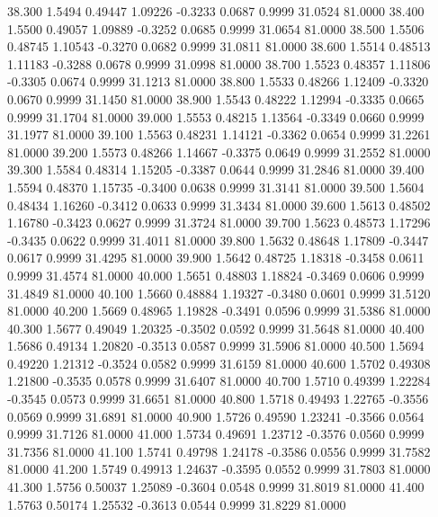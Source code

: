   38.300   1.5494   0.49447   1.09226  -0.3233   0.0687   0.9999  31.0524  81.0000
  38.400   1.5500   0.49057   1.09889  -0.3252   0.0685   0.9999  31.0654  81.0000
  38.500   1.5506   0.48745   1.10543  -0.3270   0.0682   0.9999  31.0811  81.0000
  38.600   1.5514   0.48513   1.11183  -0.3288   0.0678   0.9999  31.0998  81.0000
  38.700   1.5523   0.48357   1.11806  -0.3305   0.0674   0.9999  31.1213  81.0000
  38.800   1.5533   0.48266   1.12409  -0.3320   0.0670   0.9999  31.1450  81.0000
  38.900   1.5543   0.48222   1.12994  -0.3335   0.0665   0.9999  31.1704  81.0000
  39.000   1.5553   0.48215   1.13564  -0.3349   0.0660   0.9999  31.1977  81.0000
  39.100   1.5563   0.48231   1.14121  -0.3362   0.0654   0.9999  31.2261  81.0000
  39.200   1.5573   0.48266   1.14667  -0.3375   0.0649   0.9999  31.2552  81.0000
  39.300   1.5584   0.48314   1.15205  -0.3387   0.0644   0.9999  31.2846  81.0000
  39.400   1.5594   0.48370   1.15735  -0.3400   0.0638   0.9999  31.3141  81.0000
  39.500   1.5604   0.48434   1.16260  -0.3412   0.0633   0.9999  31.3434  81.0000
  39.600   1.5613   0.48502   1.16780  -0.3423   0.0627   0.9999  31.3724  81.0000
  39.700   1.5623   0.48573   1.17296  -0.3435   0.0622   0.9999  31.4011  81.0000
  39.800   1.5632   0.48648   1.17809  -0.3447   0.0617   0.9999  31.4295  81.0000
  39.900   1.5642   0.48725   1.18318  -0.3458   0.0611   0.9999  31.4574  81.0000
  40.000   1.5651   0.48803   1.18824  -0.3469   0.0606   0.9999  31.4849  81.0000
  40.100   1.5660   0.48884   1.19327  -0.3480   0.0601   0.9999  31.5120  81.0000
  40.200   1.5669   0.48965   1.19828  -0.3491   0.0596   0.9999  31.5386  81.0000
  40.300   1.5677   0.49049   1.20325  -0.3502   0.0592   0.9999  31.5648  81.0000
  40.400   1.5686   0.49134   1.20820  -0.3513   0.0587   0.9999  31.5906  81.0000
  40.500   1.5694   0.49220   1.21312  -0.3524   0.0582   0.9999  31.6159  81.0000
  40.600   1.5702   0.49308   1.21800  -0.3535   0.0578   0.9999  31.6407  81.0000
  40.700   1.5710   0.49399   1.22284  -0.3545   0.0573   0.9999  31.6651  81.0000
  40.800   1.5718   0.49493   1.22765  -0.3556   0.0569   0.9999  31.6891  81.0000
  40.900   1.5726   0.49590   1.23241  -0.3566   0.0564   0.9999  31.7126  81.0000
  41.000   1.5734   0.49691   1.23712  -0.3576   0.0560   0.9999  31.7356  81.0000
  41.100   1.5741   0.49798   1.24178  -0.3586   0.0556   0.9999  31.7582  81.0000
  41.200   1.5749   0.49913   1.24637  -0.3595   0.0552   0.9999  31.7803  81.0000
  41.300   1.5756   0.50037   1.25089  -0.3604   0.0548   0.9999  31.8019  81.0000
  41.400   1.5763   0.50174   1.25532  -0.3613   0.0544   0.9999  31.8229  81.0000
